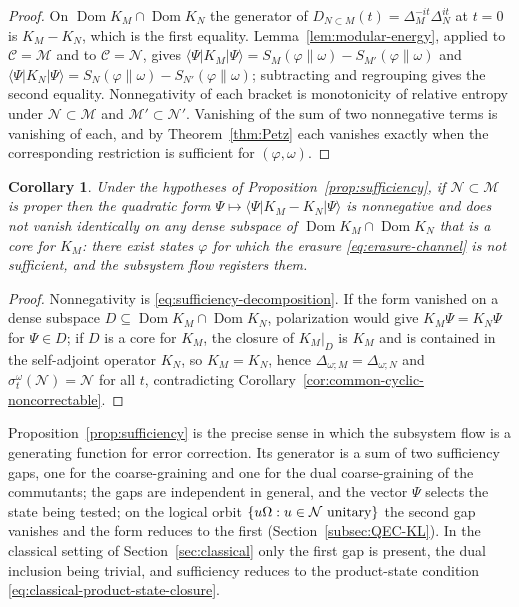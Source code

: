 \documentclass[a4paper,11pt]{article}
\newtheorem{corollary}[theorem]{Corollary}
\theoremstyle{definition}
\begin{document}
\begin{proof}
On $\operatorname{Dom}K_M\cap\operatorname{Dom}K_N$ the generator of $D_{N\subset M}(t)=\Delta_M^{-it}\Delta_N^{it}$ at $t=0$ is $K_M-K_N$, which is the first equality. Lemma~\ref{lem:modular-energy}, applied to $\mathcal C=\mathcal M$ and to $\mathcal C=\mathcal N$, gives $\langle\Psi|K_M|\Psi\rangle=S_M(\varphi\|\omega)-S_{M'}(\varphi\|\omega)$ and $\langle\Psi|K_N|\Psi\rangle=S_N(\varphi\|\omega)-S_{N'}(\varphi\|\omega)$; subtracting and regrouping gives the second equality. Nonnegativity of each bracket is monotonicity of relative entropy under $\mathcal N\subset\mathcal M$ and $\mathcal M'\subset\mathcal N'$. Vanishing of the sum of two nonnegative terms is vanishing of each, and by Theorem~\ref{thm:Petz} each vanishes exactly when the corresponding restriction is sufficient for $(\varphi,\omega)$.
\end{proof}

\begin{corollary}\label{cor:positive-generator}
Under the hypotheses of Proposition~\ref{prop:sufficiency}, if $\mathcal N\subset\mathcal M$ is proper then the quadratic form $\Psi\mapsto\langle\Psi|K_M-K_N|\Psi\rangle$ is nonnegative and does not vanish identically on any dense subspace of $\operatorname{Dom}K_M\cap\operatorname{Dom}K_N$ that is a core for $K_M$: there exist states $\varphi$ for which the erasure \eqref{eq:erasure-channel} is not sufficient, and the subsystem flow registers them.
\end{corollary}
\begin{proof}
Nonnegativity is \eqref{eq:sufficiency-decomposition}. If the form vanished on a dense subspace $D\subseteq\operatorname{Dom}K_M\cap\operatorname{Dom}K_N$, polarization would give $K_M\Psi=K_N\Psi$ for $\Psi\in D$; if $D$ is a core for $K_M$, the closure of $K_M|_D$ is $K_M$ and is contained in the self-adjoint operator $K_N$, so $K_M=K_N$, hence $\Delta_{\omega;M}=\Delta_{\omega;N}$ and $\sigma^{\omega}_t(\mathcal N)=\mathcal N$ for all $t$, contradicting Corollary~\ref{cor:common-cyclic-noncorrectable}.
\end{proof}

Proposition~\ref{prop:sufficiency} is the precise sense in which the subsystem flow is a generating function for error correction. Its generator is a sum of two sufficiency gaps, one for the coarse-graining and one for the dual coarse-graining of the commutants; the gaps are independent in general, and the vector $\Psi$ selects the state being tested; on the logical orbit $\{u\Omega:u\in\mathcal N\ \hbox{unitary}\}$ the second gap vanishes and the form reduces to the first (Section~\ref{subsec:QEC-KL}). In the classical setting of Section~\ref{sec:classical} only the first gap is present, the dual inclusion being trivial, and sufficiency reduces to the product-state condition \eqref{eq:classical-product-state-closure}.
\end{document}
